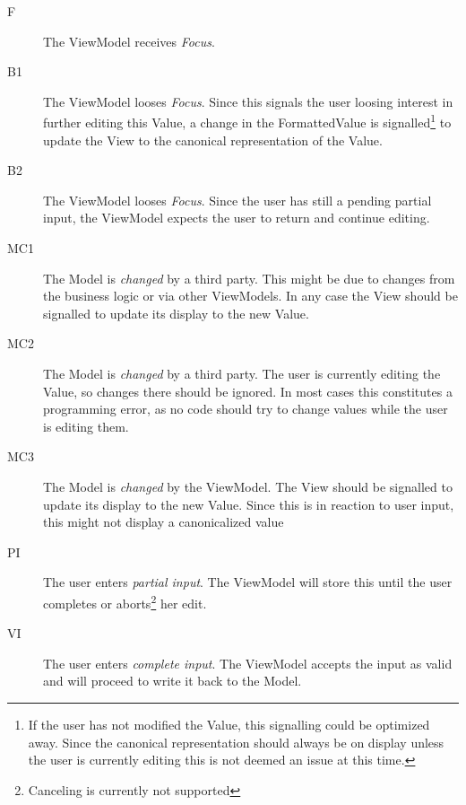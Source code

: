 \begin{description}
\item[F] {The ViewModel receives \emph{Focus}.}
\item[B1] {The ViewModel looses \emph{Focus}. Since this signals the user loosing interest in 
further editing this Value, a change in the FormattedValue is signalled\footnote{If the user has not
modified the Value, this signalling could be optimized away. Since the canonical representation 
should always be on display unless the user is currently editing this is not deemed an issue at this
time.} to update the View to the canonical representation of the Value.}
\item[B2] {The ViewModel looses \emph{Focus}. Since the user has still a pending partial input, the 
ViewModel expects the user to return and continue editing.}
\item[MC1] {The Model is \emph{changed} by a third party. This might be due to changes from the business 
logic or via other ViewModels. In any case the View should be signalled to update its display to 
the new Value.}
\item[MC2] {The Model is \emph{changed} by a third party. The user is currently editing the Value, so 
changes there should be ignored. In most cases this constitutes a programming error, as no code 
should try to change values while the user is editing them.}
\item[MC3] {The Model is \emph{changed} by the ViewModel. The View should be signalled to update its 
display to the new Value. Since this is in reaction to user input, this might not display a 
canonicalized value}
\item[PI] {The user enters \emph{partial input}. The ViewModel will store this until the user
completes or aborts\footnote{Canceling is currently not supported} her edit.}
\item[VI] {The user enters \emph{complete input}. The ViewModel accepts the input as valid and will
proceed to write it back to the Model.}
\end{description}

